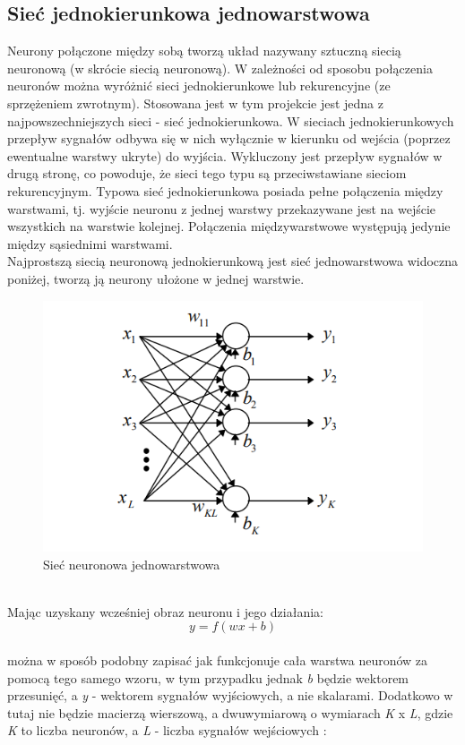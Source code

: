 \documentclass[a4paper, 12pt]{article}
\begin{document}
\subsection{Sieć jednokierunkowa jednowarstwowa}
Neurony połączone między sobą tworzą układ nazywany sztuczną siecią neuronową (w skrócie siecią neuronową). W zależności od sposobu połączenia neuronów można wyróżnić sieci jednokierunkowe lub rekurencyjne (ze sprzężeniem zwrotnym). Stosowana jest w tym projekcie jest jedna z najpowszechniejszych sieci - sieć jednokierunkowa.
 W sieciach jednokierunkowych przepływ sygnałów odbywa się w nich wyłącznie w kierunku od wejścia (poprzez ewentualne warstwy ukryte) do wyjścia. Wykluczony jest przepływ sygnałów w drugą stronę, co powoduje, że sieci tego typu są przeciwstawiane sieciom rekurencyjnym. Typowa sieć jednokierunkowa posiada pełne połączenia między warstwami, tj. wyjście neuronu z jednej warstwy przekazywane jest na wejście wszystkich na warstwie kolejnej. Połączenia międzywarstwowe występują jedynie między sąsiednimi warstwami.\\
 Najprostszą siecią neuronową jednokierunkową jest sieć jednowarstwowa widoczna poniżej, tworzą ją neurony ułożone w jednej warstwie. 
\begin{figure}[hbt!]
\includegraphics[width=12cm]{jednowarstwowa}
\centering
\caption{Sieć neuronowa jednowarstwowa\cite {book5}}
\end{figure}\\
Mając uzyskany wcześniej obraz neuronu i jego działania:
\begin{equation}
y = f \left( {wx + b } \right)
\label{Eq:2.5}
\end{equation}\\
można w sposób podobny zapisać jak funkcjonuje cała warstwa neuronów za pomocą tego samego wzoru, w tym przypadku jednak \textit{b} będzie wektorem przesunięć, a \textit{y} - wektorem sygnałów wyjściowych, a nie skalarami. Dodatkowo w tutaj nie będzie macierzą wierszową, a dwuwymiarową o wymiarach \textit{K} x \textit{L}, gdzie \textit{K} to liczba neuronów, a \textit{L} - liczba sygnałów wejściowych \cite{book5}:
\end{document}

